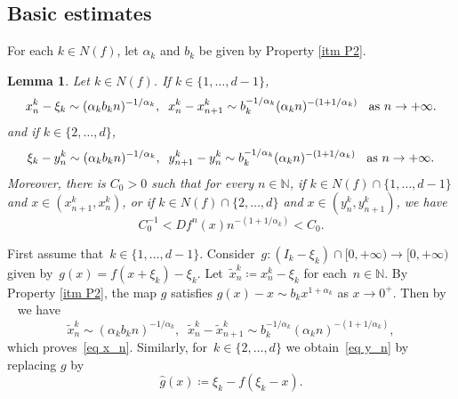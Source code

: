 \documentclass[10pt,a4paper]{amsart}
\numberwithin{equation}{section} %
\numberwithin{figure}{section} %
\newtheorem{lemm}[prop]{Lemma}
\newcommand{\N}{\mathbb{N}}
\renewcommand{\=}{\coloneqq}
\begin{document}
\subsection{Basic estimates}\label{subseq: Basic estimates}
For each $k\in N(f)$, let $\alpha_k$ and $b_k$ be given by Property \ref{itm P2}.
\begin{lemm}\label{Lemma M-P estimates}
    Let $k\in N(f)$. If $k\in\{1,\ldots,d-1\}$,
    \begin{equation}\label{eq x_n}
     x_n^k - \xi_k \sim (\alpha_kb_kn)^{-1/\alpha_k}, \;\; x_n^k - x_{n+1}^k \sim b_k^{-1/\alpha_k} (\alpha_k n )^{-(1+1/\alpha_k)} \text{\;\; as }n\to+\infty.
    \end{equation}
    and if $k\in \{2,\ldots,d\}$,
    \begin{equation}\label{eq y_n}
       \xi_k - y_{n}^k \sim (\alpha_kb_kn)^{-1/\alpha_k}, \;\;y_{n+1}^k - y_{n}^k \sim b_k^{-1/\alpha_k} (\alpha_k n )^{-(1+1/\alpha_k)} \text{\;\; as }n\to+\infty.
    \end{equation}
    Moreover, there is $C_0>0$ such that for every $n\in \mathbb{N}$, if $k\in N(f)\cap\{1,\ldots,d-1\}$ and $x\in(x^k_{n+1},x^k_n)$, or if $k\in N(f)\cap\{2,\ldots,d\}$ and $x\in(y^k_n,y^k_{n+1})$, we have
    \begin{equation}\label{eq Df^n}
        C_0^{-1}<Df^n(x)n^{-(1+1/\alpha_k)}<C_0.
    \end{equation}
\end{lemm}
\proof
    First assume that~$k\in\{1,\ldots,d-1\}$. Consider~$g:(I_k-\xi_k)\cap[0,+\infty)\to [0,+\infty)$ given 
    by~$g(x)= f(x+\xi_k) -\xi_k$. Let~$\widetilde{x}_n^k\= x_n^k - \xi_k$ for each~$n\in\N$. By Property \ref{itm P2}, the map $g$ satisfies $g(x)-x\sim b_k x^{1+\alpha_k}$ as $x\to 0^+$. Then by ~\cite[Sublemma 4.4]{CoatesMelbourneTalebi} we have
    \begin{equation*}
         \widetilde{x}_n^k \sim (\alpha_kb_kn)^{-1/\alpha_k}, \;\; \widetilde{x}_n^k - \widetilde{x}_{n+1}^k \sim b_k^{-1/\alpha_k} (\alpha_k n )^{-(1+1/\alpha_k)},
    \end{equation*}
    which proves~\eqref{eq x_n}. Similarly, for~$k\in\{2,\ldots,d\}$ we obtain~\eqref{eq y_n} by replacing $g$ 
    by 
    \begin{equation*}
    \widehat{g}(x) \= \xi_k-f(\xi_k-x).
    \end{equation*}
\end{document}
